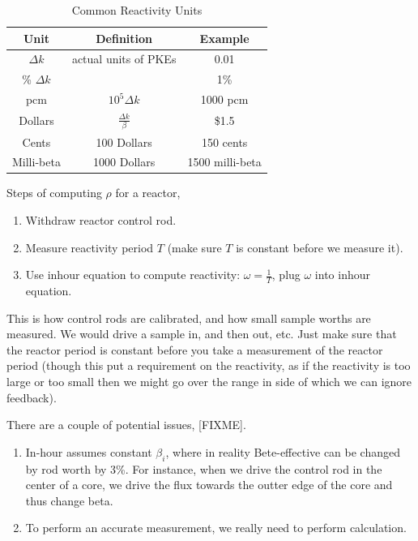 \documentclass{school-22.211-notes}
\begin{document}
\begin{table}[ht]
  \centering
  \begin{tabular}{|c|c|c|} \hline
    Unit & Definition & Example \\ \hline
    $\Delta k$ & actual units of PKEs & 0.01 \\
    \% $\Delta k$ & & 1\% \\
    pcm & $10^5 \Delta k $ & 1000 pcm \\ \hline
    Dollars & $\frac{\Delta k}{\beta}$ & \$1.5 \\
    Cents & 100 Dollars & 150 cents \\ 
    Milli-beta & 1000 Dollars & 1500 milli-beta \\ \hline
  \end{tabular}
  \caption{Common Reactivity Units}
\end{table}



Steps of computing $\rho$ for a reactor, 
\begin{enumerate}
\item Withdraw reactor control rod.
\item Measure reactivity period $T$ (make sure $T$ is constant before we measure it).
\item Use inhour equation to compute reactivity: $\omega = \frac{1}{T}$, plug $\omega$ into inhour equation. 
\end{enumerate}
This is how control rods are calibrated, and how small sample worths are measured. We would drive a sample in, and then out, etc. Just make sure that the reactor period is constant before you take a measurement of the reactor period (though this put a requirement on the reactivity, as if the reactivity is too large or too small then we might go over the range in side of which we can ignore feedback). 


There are a couple of potential issues, [FIXME].
\begin{enumerate}
\item In-hour assumes constant $\beta_i$, where in reality Bete-effective can be changed by rod worth by 3\%. For instance, when we drive the control rod in the center of a core, we drive the flux towards the outter edge of the core and thus change beta. 

\item To perform an accurate measurement, we really need to perform calculation. 
\end{enumerate}
\end{document}
